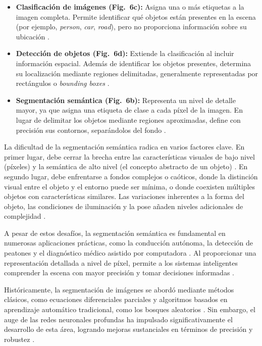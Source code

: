 	\begin{itemize}
		\item \textbf{Clasificación de imágenes (Fig.~6c):} Asigna una o más etiquetas a la imagen completa. Permite identificar qué objetos están presentes en la escena (por ejemplo, \textit{person}, \textit{car}, \textit{road}), pero no proporciona información sobre su ubicación \cite{hao2020}.
		
		\item \textbf{Detección de objetos (Fig.~6d):} Extiende la clasificación al incluir información espacial. Además de identificar los objetos presentes, determina su localización mediante regiones delimitadas, generalmente representadas por rectángulos o \textit{bounding boxes} \cite{hao2020}.
		
		\item \textbf{Segmentación semántica (Fig.~6b):} Representa un nivel de detalle mayor, ya que asigna una etiqueta de clase a cada píxel de la imagen. En lugar de delimitar los objetos mediante regiones aproximadas, define con precisión sus contornos, separándolos del fondo \cite{hao2020}.
	\end{itemize}
	
	
	La dificultad de la segmentación semántica radica en varios factores clave. En primer lugar, debe cerrar la brecha entre las características visuales de bajo nivel (píxeles) y la semántica de alto nivel (el concepto abstracto de un objeto) \cite{hao2020}. En segundo lugar, debe enfrentarse a fondos complejos o caóticos, donde la distinción visual entre el objeto y el entorno puede ser mínima, o donde coexisten múltiples objetos con características similares. Las variaciones inherentes a la forma del objeto, las condiciones de iluminación y la pose añaden niveles adicionales de complejidad \cite{barik2010}.
	
	A pesar de estos desafíos, la segmentación semántica es fundamental en numerosas aplicaciones prácticas, como la conducción autónoma, la detección de peatones y el diagnóstico médico asistido por computadora \cite{barik2010}. Al proporcionar una representación detallada a nivel de píxel, permite a los sistemas inteligentes comprender la escena con mayor precisión y tomar decisiones informadas \cite{hao2020}.
	
	Históricamente, la segmentación de imágenes se abordó mediante métodos clásicos, como ecuaciones diferenciales parciales y algoritmos basados en aprendizaje automático tradicional, como los bosques aleatorios \cite{hao2020}. Sin embargo, el auge de las redes neuronales profundas ha impulsado significativamente el desarrollo de esta área, logrando mejoras sustanciales en términos de precisión y robustez \cite{barik2010}.
	
